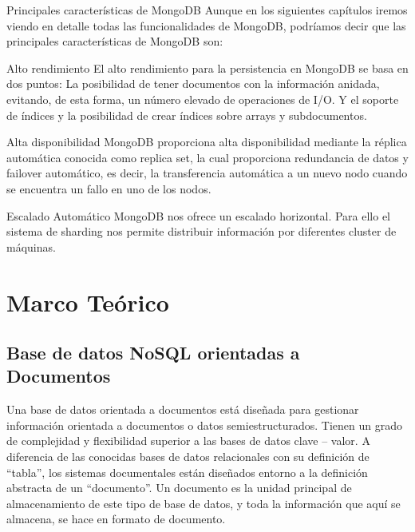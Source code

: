 \documentclass[preprint,12pt]{elsarticle}
\begin{document}
Principales características de MongoDB
Aunque en los siguientes capítulos iremos viendo en detalle todas las funcionalidades de MongoDB, podríamos decir que las principales características de MongoDB son:

Alto rendimiento
El alto rendimiento para la persistencia en MongoDB se basa en dos puntos: La posibilidad de tener documentos con la información anidada, evitando, de esta forma, un número elevado de operaciones de I/O. Y el soporte de índices y la posibilidad de crear índices sobre arrays y subdocumentos.

Alta disponibilidad
MongoDB proporciona alta disponibilidad mediante la réplica automática conocida como replica set, la cual proporciona redundancia de datos y failover automático, es decir, la transferencia automática a un nuevo nodo cuando se encuentra un fallo en uno de los nodos.

Escalado Automático
MongoDB nos ofrece un escalado horizontal. Para ello el sistema de sharding nos permite distribuir información por diferentes cluster de máquinas.




\section{Marco Teórico}


\subsection {\textbf{Base de datos NoSQL orientadas a Documentos}}
Una base de datos orientada a documentos está diseñada para gestionar información orientada a documentos o datos semiestructurados. Tienen un grado de complejidad y flexibilidad superior a las bases de datos clave – valor. \newline
A diferencia de las conocidas bases de datos relacionales con su definición de “tabla”, los sistemas documentales están diseñados entorno a la definición abstracta de un “documento”. Un documento es la unidad principal de almacenamiento de este tipo de base de datos, y toda la información que aquí se almacena, se hace en formato de documento. \newline
\end{document}
